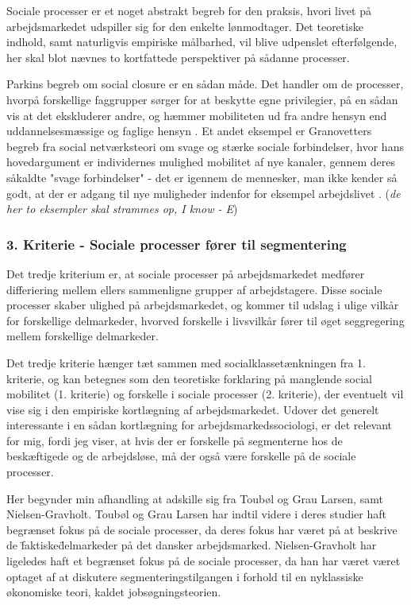 Sociale processer er et noget abstrakt begreb for den praksis, hvori livet på arbejdsmarkedet udspiller sig for den enkelte lønmodtager. Det teoretiske indhold, samt naturligvis empiriske målbarhed, vil blive udpenslet efterfølgende, her skal blot nævnes to kortfattede perspektiver på sådanne processer. 

Parkins begreb om social closure er en sådan måde. Det handler om de processer, hvorpå forskellige faggrupper sørger for at beskytte egne privilegier, på en sådan vis at det ekskluderer andre, og hæmmer mobiliteten ud fra andre hensyn end uddannelsesmæssige og faglige hensyn \parencite{Parkin1994}. Et andet eksempel er Granovetters begreb fra social netværksteori om svage og stærke sociale forbindelser, hvor hans hovedargument er individernes mulighed mobilitet af nye kanaler, gennem deres såkaldte "svage forbindelser" - det er igennem de mennesker, man ikke kender så godt, at der er adgang til nye muligheder indenfor for eksempel arbejdslivet \parencite{Granovetter1973}. (\emph{de her to eksempler skal strammes op, I know - E})


\subsubsection{3. Kriterie - Sociale processer fører til segmentering}

Det tredje kriterium er, at sociale processer på arbejdsmarkedet medfører differiering mellem ellers sammenligne grupper af arbejdstagere. Disse sociale processer skaber ulighed på arbejdsmarkedet, og kommer til udslag i ulige vilkår for forskellige delmarkeder, hvorved forskelle i livsvilkår fører til øget seggregering mellem forskellige delmarkeder. 

Det tredje kriterie hænger tæt sammen med socialklassetænkningen fra 1. kriterie, og kan betegnes som den teoretiske forklaring på manglende social mobilitet (1. kriterie) og forskelle i sociale processer (2. kriterie), der eventuelt vil vise sig i den empiriske kortlægning af arbejdsmarkedet. Udover det generelt interessante i en sådan kortlægning for arbejdsmarkedssociologi, er det relevant for mig, fordi jeg viser, at hvis der er forskelle på segmenterne hos de beskæftigede og de arbejdsløse, må der også være forskelle på de sociale processer. 

Her begynder min afhandling at adskille sig fra Toubøl og Grau Larsen, samt Nielsen-Gravholt. Toubøl og Grau Larsen har indtil videre i deres studier haft begrænset fokus på de sociale processer, da deres fokus har været på at beskrive de \"faktiske\" delmarkeder på det dansker arbejdsmarked. Nielsen-Gravholt har ligeledes haft et begrænset fokus på de sociale processer, da han har været været optaget af at diskutere segmenteringstilgangen i forhold til en nyklassiske økonomiske teori, kaldet jobsøgningsteorien. 

